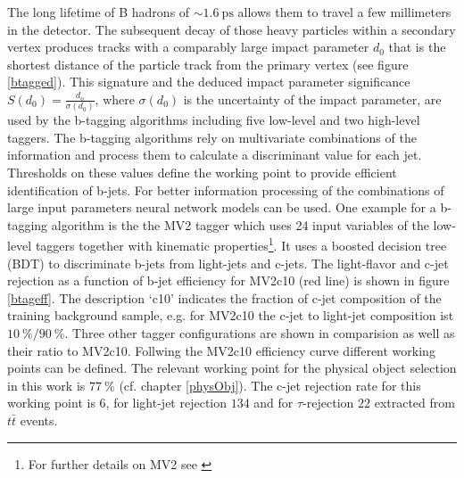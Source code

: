 The long lifetime of B hadrons of $\sim\SI{1.6}{\pico\second}$ allows them to travel a few millimeters in the detector. The subsequent decay of those heavy particles within a secondary vertex produces tracks with a comparably large impact parameter $d_0$ that is the shortest distance of the particle track from the primary vertex (see figure \ref{btagged}). This signature and the deduced impact parameter significance $S(d_0)=\frac{d_o}{\sigma(d_0)}$, where $\sigma(d_0)$ is the uncertainty of the impact parameter, are used by the b-tagging algorithms including five low-level and two high-level taggers. \cite{Hansson} The b-tagging algorithms rely on multivariate combinations of the information and process them to calculate a discriminant value for each jet. Thresholds on these values define the working point to provide efficient identification of b-jets. For better information processing of the combinations of large input parameters neural network models can be used. \cite{Luca} One example for a b-tagging algorithm is the the MV2 tagger which uses 24 input variables of the low-level taggers together with kinematic properties\footnote{For further details on MV2 see \cite{MV2}}. \cite{Paganini} It uses a boosted decision tree (BDT) to discriminate b-jets from light-jets and c-jets. \cite{MV2} The light-flavor and c-jet rejection as a function of b-jet efficiency for MV2c10 (red line) is shown in figure \ref{btageff}. The description `c10' indicates the fraction of c-jet composition of the training background sample, e.g. for MV2c10 the c-jet to light-jet composition ist $\SI{10}{\percent}/\SI{90}{\percent}$. Three other tagger configurations are shown in comparision as well as their ratio to MV2c10. Follwing the MV2c10 efficiency curve different working points can be defined. The relevant working point for the physical object selection in this work is $\SI{77}{\percent}$ (cf. chapter \ref{physObj}). The c-jet rejection rate for this working point is $6$, for light-jet rejection $134$ and for $\tau$-rejection $22$ extracted from $t\bar{t}$ events. \cite{MV2c10}    
